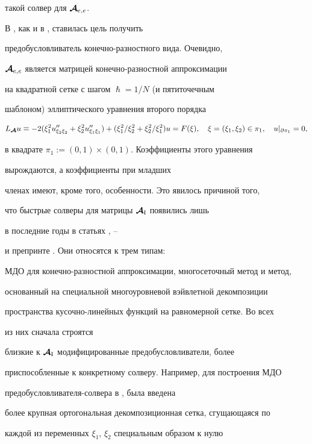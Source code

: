 такой солвер для $\boldsymbol {\cal A}_{e,e}$.





В \cite{KI1996}, как и в \cite{IvanovKorneev:95}, ставилась цель получить 


предобусловливатель конечно-разностного вида. Очевидно, 


${\boldsymbol {\cal A}}_{e,e}$ является матрицей конечно-разностной аппроксимации 


на квадратной сетке с шагом $\hslash=1/N$ (и пятиточечным


шаблоном) эллиптического уравнения второго порядка


$$


L_{{\bi{\cal A}}}u\equiv-2(\xi_1^2 u_{\xi_2\xi_2}''+\xi_2^2 u_{\xi_1\xi_1}'')+


(\xi_1^2/\xi_2^2 + \xi_2^2/\xi_1^2)u =


F(\xi), \quad \xi=(\xi_1,\xi_2)\in\pi_1, \quad u|_{\partial \pi_1}=0,


$$


в квадрате $\pi_1:=(0,1)\times(0,1)$. Коэффициенты этого уравнения 


вырождаются, а коэффициенты при младших


членах имеют, кроме того, особенности. Это явилось причиной того,


что быстрые солверы для матрицы ${\boldsymbol {\cal {A}}}_{\mathrm{I}}$ появились лишь 


в последние годы в статьях \cite{B2002}, \cite{K2001}--\cite{Korneev:02b}


и препринте \cite{BSS2002}. Они относятся к трем типам:


МДО для конечно-разностной аппроксимации, многосеточный метод и метод,


основанный на специальной многоуровневой вэйвлетной декомпозиции 


пространства кусочно-линейных функций на равномерной сетке. Во всех 


из них сначала строятся


близкие к ${\boldsymbol {\cal {A}}}_{\mathrm{I}}$ модифицированные предобусловливатели, более


приспособленные к конкретному солверу. Например, для построения МДО


предобусловливателя-солвера в \cite{K2001}, \cite{K2002} была введена


более крупная ортогональная декомпозиционная сетка, сгущающаяся по


каждой из переменных $\xi_1$, $\xi_2$ специальным образом к нулю


